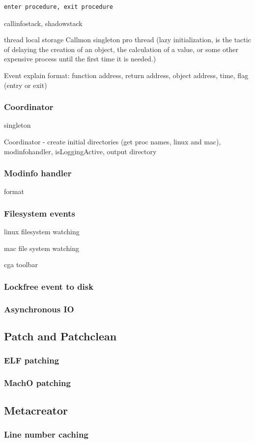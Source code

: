 \begin{verbatim}
enter procedure, exit procedure
\end{verbatim}

callinfostack, shadowstack

thread local storage
Callmon singleton pro thread (lazy initialization, is the tactic of delaying the creation of an object, the calculation of a value, or some other expensive process until the first time it is needed.)

Event explain format:
function address, return address, object address, time, flag (entry or exit)

\subsubsection{Coordinator}

singleton

Coordinator - create initial directories (get proc names, linux and mac), modinfohandler, isLoggingActive, output directory

\subsubsection{Modinfo handler}
format

\subsubsection{Filesystem events}

linux filesystem watching

mac file system watching

cga toolbar

\subsubsection{Lockfree event to disk} 

\subsubsection{Asynchronous IO}

\subsection{Patch and Patchclean} 

\subsubsection{ELF patching} 

\subsubsection{MachO patching}

\subsection{Metacreator} 

\subsubsection{Line number caching} 
